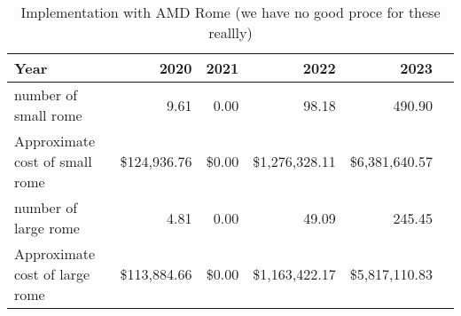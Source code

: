 \tiny \begin{longtable} { |p{}  |r  |r  |r  |r  |r |} 
\caption{Implementation with AMD Rome (we have no good proce for these reallly) \label{tab:Rome}}\\ 
\hline 
\textbf{Year}&\textbf{2020}&\textbf{2021}&\textbf{2022}&\textbf{2023} \\ \hline
{number of small rome }&{9.61}&{0.00}&{98.18}&{490.90} \\ \hline
{Approximate cost of small rome }&{\$124,936.76}&{\$0.00}&{\$1,276,328.11}&{\$6,381,640.57} \\ \hline
{number of large rome }&{4.81}&{0.00}&{49.09}&{245.45} \\ \hline
{Approximate cost of large rome }&{\$113,884.66}&{\$0.00}&{\$1,163,422.17}&{\$5,817,110.83} \\ \hline
\end{longtable} \normalsize
